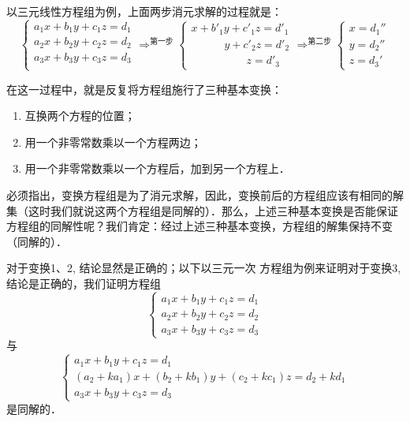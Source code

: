 以三元线性方程组为例，上面两步消元求解的过程就是：
\[\begin{cases}
    a_1x+b_1y+c_1z=d_1\\
    a_2x+b_2y+c_2z=d_2\\
    a_3x+b_3y+c_3z=d_3\\
\end{cases}\mathop{\Longrightarrow}^{\text{第一步}} \begin{cases}
    x+b'_1y+c'_1z=d'_1\\
  \qquad \quad  y+c'_2z=d'_2\\
  \qquad \qquad \quad  z=d'_3
\end{cases}\mathop{\Longrightarrow}^{\text{第二步}}  \begin{cases}
    x=d_1''\\ y=d_2''\\ z=d_3'
\end{cases}\]

在这一过程中，就是反复将方程组施行了三种基本变换：
\begin{enumerate}
    \item 互换两个方程的位置；
    \item 用一个非零常数乘以一个方程两边；
    \item 用一个非零常数乘以一个方程后，加到另一个方程上．
\end{enumerate}

必须指出，变换方程组是为了消元求解，因此，变换前后的方程组应该有相同的解集（这时我们就说这两个方程组是同解的）．那么，上述三种基本变换是否能保证方程组的同解性呢？我们肯定：经过上述三种基本变换，方程组的解集保持不变（同解的）．

对于变换1、2, 结论显然是正确的；以下以三元一次
方程组为例来证明对于变换3, 结论是正确的，我们证明方程组
\begin{equation}
    \begin{cases}
      a_1x+b_1y+c_1z=d_1\\    a_2x+b_2y+c_2z=d_2\\    a_3x+b_3y+c_3z=d_3
    \end{cases}
\end{equation}
与
\begin{equation}
    \begin{cases}
        a_1x+b_1y+c_1z=d_1\\   (a_2+ka_1)x+(b_2+kb_1)y+(c_2+kc_1)z=d_2+kd_1\\
        a_3x+b_3y+c_3z=d_3
    \end{cases} 
\end{equation}
是同解的．

